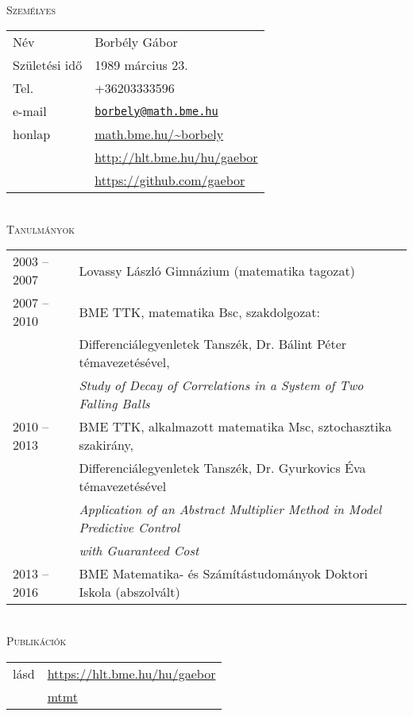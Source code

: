 \documentclass[12pt]{article}
\newcommand\mail[1]{\href{mailto:#1}{\texttt{#1}}}
\begin{document}
{ \ }
\\
\textsc{Személyes}
 \vspace{0.3cm}
 \\
       \begin{tabular}{p{3cm}l}
	       Név & Borbély Gábor \\
           Születési idő & 1989 március 23.\\
		   Tel. &  +36203333596\\
		   e-mail & \mail{borbely@math.bme.hu}\\
		   honlap & \url{math.bme.hu/~borbely} \\
                  & \url{http://hlt.bme.hu/hu/gaebor} \\
                  & \url{https://github.com/gaebor}
       \end{tabular}
 \vspace{0.3cm}
 \\
 \textsc{Tanulmányok}
 \vspace{0.3cm}
 \\
       \begin{tabular}{p{3cm}l}
	       2003 -- 2007 & Lovassy László Gimnázium (matematika tagozat) \\
           2007 -- 2010& BME TTK, matematika Bsc, szakdolgozat: \\
		              & Differenciálegyenletek Tanszék, Dr. Bálint Péter témavezetésével, \\
					  & \emph{Study of Decay of Correlations in a System of Two Falling Balls} \\
		   2010 -- 2013 & BME TTK, alkalmazott matematika Msc, sztochasztika szakirány,\\
						& Differenciálegyenletek Tanszék, Dr. Gyurkovics Éva témavezetésével \\
						& \emph{Application of an Abstract Multiplier Method in Model Predictive Control}\\ & \emph{ with Guaranteed Cost} \\
		   2013 -- 2016 & BME Matematika- és Számítástudományok Doktori Iskola (abszolvált)
       \end{tabular}
 \vspace{0.3cm}
 \\
 \textsc{Publikációk}
 \vspace{0.3cm}
 \\
        \begin{tabular}{p{3cm}l}
	       lásd & \url{https://hlt.bme.hu/hu/gaebor} \\ 
               &  \href{https://m2.mtmt.hu/gui2/?type=authors&mode=browse&sel=10043154}{mtmt}
       \end{tabular}
\end{document}
